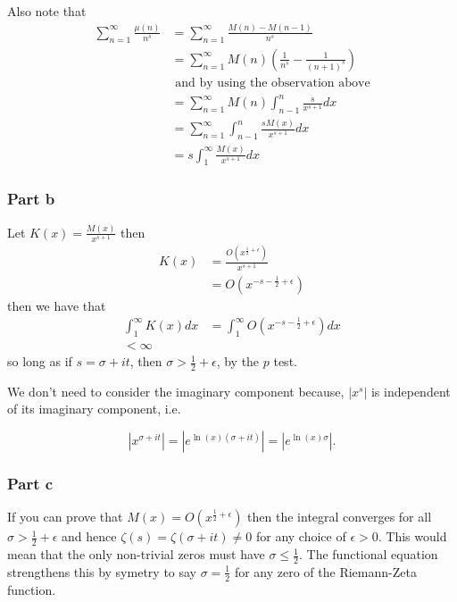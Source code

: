 \documentclass{unswmaths}
\begin{document}
Also note that
\begin{align*}
	\sum_{n=1}^\infty \frac{\mu(n)}{n^s} &= \sum_{n=1}^\infty \frac{M(n) - M(n-1)}{n^s} \\
		&= \sum_{n=1}^\infty M(n) \left( \frac{1}{n^s} - \frac{1}{(n+1)^s} \right) \\
		& \text{ and by using the observation above} \\
		&= \sum_{n=1}^\infty M(n) \int_{n-1}^n \frac{s}{x^{s+1}} dx \\
		&= \sum_{n=1}^\infty \int_{n-1}^n \frac{s M(x)}{x^{s+1}} dx \\
		&= s \int_1^\infty\frac{M(x)}{x^{s+1}} dx
\end{align*}

\subsubsection*{Part b}

Let $ K(x) = \frac{M(x)}{x^{s+1}} $ then
\begin{align*}
	K(x) &= \frac{O(x^{\frac{1}{2} + \epsilon})}{x^{s+1}} \\
		&= O(x^{-s-\frac{1}{2} + \epsilon})
\end{align*}
then we have that 
\begin{align*}
	\int_1^\infty K(x) dx &= \int_1^\infty O(x^{-s-\frac{1}{2} + \epsilon}) dx \\
		< \infty
\end{align*}
so long as if $ s = \sigma + it $, then $ \sigma > \frac{1}{2} + \epsilon $, by the $ p $ test.



We don't need to consider the imaginary component because, $| x^s | $ is independent
of its imaginary component, i.e. 

$$ |x^{\sigma + it}| = |e^{\ln(x)(\sigma + it)}| = |e^{\ln(x)\sigma}|. $$

\subsubsection*{Part c}
If you can prove that $ M(x) = O(x^{\frac{1}{2} + \epsilon }) $ then the integral converges for all $ \sigma > \frac{1}{2} + \epsilon $
and hence $ \zeta(s) = \zeta(\sigma + it) \neq 0 $ for any choice of $ \epsilon > 0 $. This would mean that the only non-trivial zeros
must have $ \sigma \leq \frac{1}{2} $. The functional equation strengthens this by symetry to say $ \sigma = \frac{1}{2} $ for any
zero of the Riemann-Zeta function.
\end{document}
